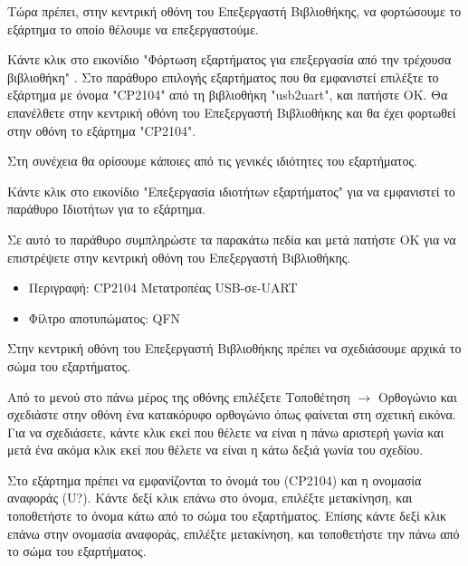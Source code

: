 \documentclass[a4paper]{article}
\begin{document}
Τώρα πρέπει, στην κεντρική οθόνη του Επεξεργαστή Βιβλιοθήκης, να φορτώσουμε το εξάρτημα το οποίο θέλουμε να επεξεργαστούμε. 

Κάντε κλικ στο εικονίδιο "Φόρτωση εξαρτήματος για επεξεργασία από την τρέχουσα βιβλιοθήκη" %
. Στο παράθυρο επιλογής εξαρτήματος που θα εμφανιστεί επιλέξτε το εξάρτημα με όνομα "\textenglish{CP2104}" από τη βιβλιοθήκη "usb2uart", και πατήστε ΟΚ. Θα επανέλθετε στην κεντρική οθόνη του Επεξεργαστή Βιβλιοθήκης και θα έχει φορτωθεί στην οθόνη το εξάρτημα "\textenglish{CP2104}".

Στη συνέχεια θα ορίσουμε κάποιες από τις γενικές ιδιότητες του εξαρτήματος. 

Κάντε κλικ στο εικονίδιο "Επεξεργασία ιδιοτήτων εξαρτήματος" %
για να εμφανιστεί το παράθυρο Ιδιοτήτων για το εξάρτημα. 

\begin{figure}
  \begin{center}
    \label{fig:kicad-main}
  \end{center}
\end{figure}

Σε αυτό το παράθυρο συμπληρώστε τα παρακάτω πεδία και μετά πατήστε ΟΚ για να επιστρέψετε στην κεντρική οθόνη του Επεξεργαστή Βιβλιοθήκης.

\begin{itemize}
    \item Περιγραφή: \textenglish{CP2104} Μετατροπέας USB-σε-UART
    \item Φίλτρο αποτυπώματος: QFN
\end{itemize}

Στην κεντρική οθόνη του Επεξεργαστή Βιβλιοθήκης πρέπει να σχεδιάσουμε αρχικά το σώμα του εξαρτήματος. 

Από το μενού στο πάνω μέρος της οθόνης επιλέξετε Τοποθέτηση $\rightarrow$ Ορθογώνιο και σχεδιάστε στην οθόνη ένα κατακόρυφο ορθογώνιο όπως φαίνεται στη σχετική εικόνα. Για να σχεδιάσετε, κάντε κλικ εκεί που θέλετε να είναι η πάνω αριστερή γωνία και μετά ένα ακόμα κλικ εκεί που θέλετε να είναι η κάτω δεξιά γωνία του σχεδίου.

Στο εξάρτημα πρέπει να εμφανίζονται το όνομά του (\textenglish{CP2104}) και η ονομασία αναφοράς (U?). Κάντε δεξί κλικ επάνω στο όνομα, επιλέξτε μετακίνηση, και τοποθετήστε το όνομα κάτω από το σώμα του εξαρτήματος. Επίσης κάντε δεξί κλικ επάνω στην ονομασία αναφοράς, επιλέξτε μετακίνηση, και τοποθετήστε την πάνω από το σώμα του εξαρτήματος. 
\end{document}
